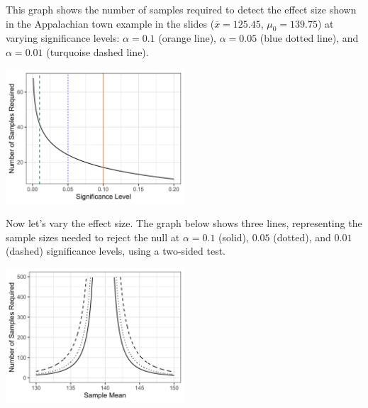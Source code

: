This graph shows the number of samples required to detect the effect size shown in the Appalachian town example in the slides ($\overline{x} = 125.45$, $\mu_0 = 139.75$) at varying significance levels: $\alpha = 0.1$ (orange line), $\alpha = 0.05$ (blue dotted line), and $\alpha = 0.01$ (turquoise dashed line). 

\begin{center}
\includegraphics[width=0.5\textwidth]{img/hyp-z-test-power-curve-1.png}
\end{center}

Now let's vary the effect size. The graph below shows three lines, representing the sample sizes needed to reject the null at $\alpha = 0.1$ (solid), $0.05$ (dotted), and $0.01$ (dashed) significance levels, using a two-sided test.

\begin{center}
\includegraphics[width=0.5\textwidth]{img/hyp-z-test-power-curve-2.png}
\end{center}
